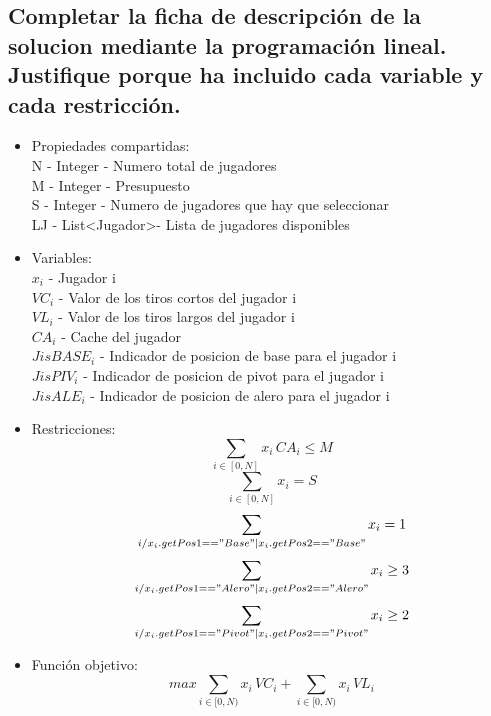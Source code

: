 \documentclass[a4paper,12pt]{article}
\begin{document}
\subsection{Completar la ficha de descripción de la solucion mediante la programación lineal. Justifique porque ha incluido cada variable y cada restricción.}

\begin{itemize}
\item Propiedades compartidas:\\
N - Integer - Numero total de jugadores\\
M - Integer - Presupuesto\\
S - Integer - Numero de jugadores que hay que seleccionar\\
LJ - List\textless Jugador\textgreater - Lista de jugadores disponibles\\
\item Variables:\\
$ x_i $ - Jugador i\\
$VC_i$ - Valor de los tiros cortos del jugador i\\
$ VL_i $ - Valor de los tiros largos del jugador i\\
$ CA_i $ - Cache del jugador\\
$ JisBASE_i $ - Indicador de posicion de base para el jugador i\\
$ JisPIV_i $ - Indicador de posicion de pivot para el jugador i\\
$ JisALE_i $ - Indicador de posicion de alero para el jugador i\\

\item Restricciones:\\
\setcounter{equation}{0}
\begin{equation}
 \sum_{i \in [0,N]}{x_i \, CA_i} \leq M
\end{equation}
 \begin{equation}
 \sum_{i \in [0,N]}{x_i} = S
\end{equation}
\begin{equation}
 \sum_{i / x_i.getPos1=="Base" | x_i.getPos2=="Base"}{x_i} = 1
\end{equation}
\begin{equation}
 \sum_{i / x_i.getPos1=="Alero" | x_i.getPos2=="Alero"}{x_i} \geq 3
\end{equation}
\begin{equation}
 \sum_{i / x_i.getPos1=="Pivot" | x_i.getPos2=="Pivot"}{x_i} \geq 2
\end{equation}
\item{Función objetivo:}
\begin{equation*}
max  \sum_{i \in [0,N)}{x_i \, VC_i}+\sum_{i \in [0,N)}{x_i \, VL_i}
\end{equation*}
\end{itemize}
\end{document}
